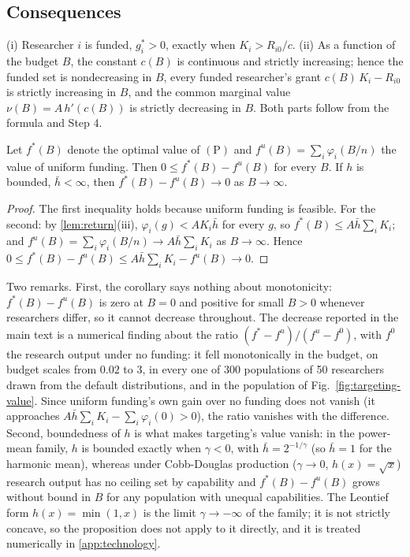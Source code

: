 \subsection*{Consequences}

\begin{corollary}\label{cor:frontier}
(i) Researcher $i$ is funded, $g_i^* > 0$, exactly when $K_i > R_{i0}/c$. (ii) As a function of the budget $B$, the constant $c(B)$ is continuous and strictly increasing; hence the funded set is nondecreasing in $B$, every funded researcher's grant $c(B)\,K_i - R_{i0}$ is strictly increasing in $B$, and the common marginal value $\nu(B) = A\,h'(c(B))$ is strictly decreasing in $B$. Both parts follow from the formula and Step 4.
\end{corollary}
\begin{corollary}\label{cor:targeting-vanishes}
Let $f^*(B)$ denote the optimal value of $(\mathrm{P})$ and $f^u(B) = \sum_i \varphi_i(B/n)$ the value of uniform funding. Then $0 \leq f^*(B) - f^u(B)$ for every $B$. If $h$ is bounded, $\bar h < \infty$, then $f^*(B) - f^u(B) \to 0$ as $B \to \infty$.
\end{corollary}

\begin{proof}
The first inequality holds because uniform funding is feasible. For the second: by \cref{lem:return}(iii), $\varphi_i(g) < A K_i \bar h$ for every $g$, so $f^*(B) \leq A\bar h\sum_i K_i$; and $f^u(B) = \sum_i \varphi_i(B/n) \to A\bar h\sum_i K_i$ as $B \to \infty$. Hence $0 \leq f^*(B) - f^u(B) \leq A\bar h\sum_i K_i - f^u(B) \to 0$.
\end{proof}

Two remarks. First, the corollary says nothing about monotonicity: $f^*(B) - f^u(B)$ is zero at $B = 0$ and positive for small $B > 0$ whenever researchers differ, so it cannot decrease throughout. The decrease reported in the main text is a numerical finding about the ratio $(f^* - f^u)/(f^u - f^0)$, with $f^0$ the research output under no funding: it fell monotonically in the budget, on budget scales from $0.02$ to $3$, in every one of 300 populations of 50 researchers drawn from the default distributions, and in the population of Fig.~\ref{fig:targeting-value}. Since uniform funding's own gain over no funding does not vanish (it approaches $A\bar h\sum_i K_i - \sum_i \varphi_i(0) > 0$), the ratio vanishes with the difference. Second, boundedness of $h$ is what makes targeting's value vanish: in the power-mean family, $h$ is bounded exactly when $\gamma < 0$, with $\bar h = 2^{-1/\gamma}$ (so $\bar h = 1$ for the harmonic mean), whereas under Cobb-Douglas production ($\gamma \to 0$, $h(x) = \sqrt{x}$) research output has no ceiling set by capability and $f^*(B) - f^u(B)$ grows without bound in $B$ for any population with unequal capabilities. The Leontief form $h(x) = \min(1, x)$ is the limit $\gamma \to -\infty$ of the family; it is not strictly concave, so the proposition does not apply to it directly, and it is treated numerically in \ref{app:technology}.

